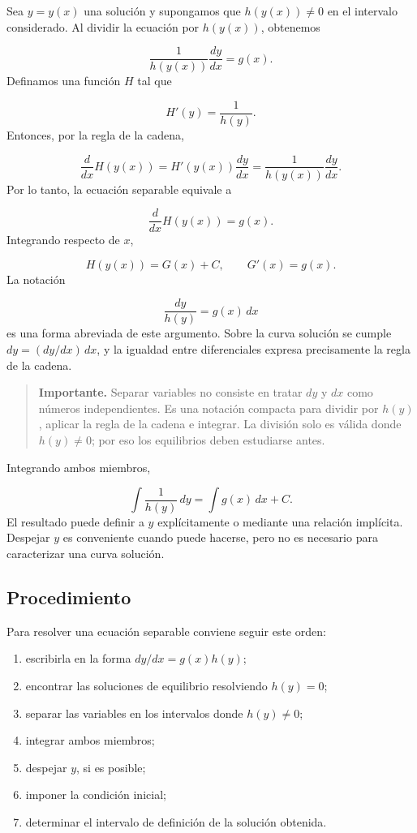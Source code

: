 \documentclass[12pt,a4paper]{article}
\begin{document}
	Sea \(y=y(x)\) una solución y supongamos que \(h(y(x))\neq0\) en el intervalo considerado. Al dividir la ecuación por \(h(y(x))\), obtenemos

	\[
	\frac{1}{h(y(x))}\frac{dy}{dx}=g(x).
	\]
	Definamos una función \(H\) tal que

	\[
	H'(y)=\frac{1}{h(y)}.
	\]
	Entonces, por la regla de la cadena,

	\[
	\frac{d}{dx}H(y(x))
	=
	H'(y(x))\frac{dy}{dx}
	=
	\frac{1}{h(y(x))}\frac{dy}{dx}.
	\]
	Por lo tanto, la ecuación separable equivale a

	\[
	\frac{d}{dx}H(y(x))=g(x).
	\]
	Integrando respecto de \(x\),

	\[
	H(y(x))=G(x)+C,
	\qquad
	G'(x)=g(x).
	\]
	La notación

	\[
	\frac{dy}{h(y)}=g(x)\,dx
	\]
	es una forma abreviada de este argumento. Sobre la curva solución se cumple \(dy=(dy/dx)\,dx\), y la igualdad entre diferenciales expresa precisamente la regla de la cadena.

	\begin{quote}
		\textbf{Importante.} Separar variables no consiste en tratar \(dy\) y \(dx\) como números independientes. Es una notación compacta para dividir por \(h(y)\), aplicar la regla de la cadena e integrar. La división solo es válida donde \(h(y)\neq0\); por eso los equilibrios deben estudiarse antes.
	\end{quote}

	Integrando ambos miembros,

	\[
	\int\frac{1}{h(y)}\,dy
	=
	\int g(x)\,dx+C.
	\]
	El resultado puede definir a \(y\) explícitamente o mediante una relación implícita. Despejar \(y\) es conveniente cuando puede hacerse, pero no es necesario para caracterizar una curva solución.

	\subsection{Procedimiento}

	Para resolver una ecuación separable conviene seguir este orden:

	\begin{enumerate}[label=\arabic*.]
		\item escribirla en la forma \(dy/dx=g(x)h(y)\);
		\item encontrar las soluciones de equilibrio resolviendo \(h(y)=0\);
		\item separar las variables en los intervalos donde \(h(y)\neq0\);
		\item integrar ambos miembros;
		\item despejar \(y\), si es posible;
		\item imponer la condición inicial;
		\item determinar el intervalo de definición de la solución obtenida.
	\end{enumerate}
\end{document}
